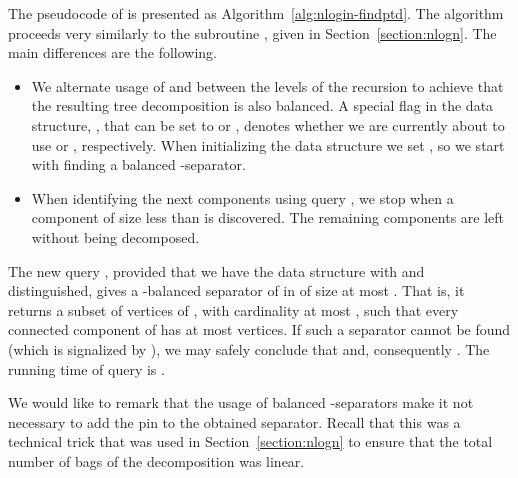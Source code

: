 \documentclass[a4paper,11pt]{article}
\theoremstyle{definition}
\theoremstyle{remark}
\begin{document}
The pseudocode of  is presented as
Algorithm~\ref{alg:nlogin-findptd}.  The algorithm proceeds very
similarly to the subroutine , given in
Section~\ref{section:nlogn}.  The main differences are the following.
\begin{itemize}
\item We alternate usage of  and  between the levels
  of the recursion to achieve that the resulting tree decomposition is
  also balanced.  A special flag in the data structure, ,
  that can be set to  or , denotes whether we are currently
  about to use  or , respectively.  When initializing
  the data structure we set , so we start with finding a
  balanced -separator.
\item When identifying the next components using query , we
  stop when a component of size less than  is discovered.  The
  remaining components are left without being decomposed.
\end{itemize}
The new query , provided that we have the data structure with
 and  distinguished, gives a -balanced separator
of  in  of size at most .  That is, it returns a subset
 of vertices of , with cardinality at most , such that
every connected component of  has at most
 vertices.  If such a separator cannot be found (which
is signalized by ), we may safely conclude that 
and, consequently .  The running time of query  is
.

We would like to remark that the usage of balanced -separators make
it not necessary to add the pin to the obtained separator.  Recall
that this was a technical trick that was used in
Section~\ref{section:nlogn} to ensure that the total number of bags of
the decomposition was linear.
\end{document}

